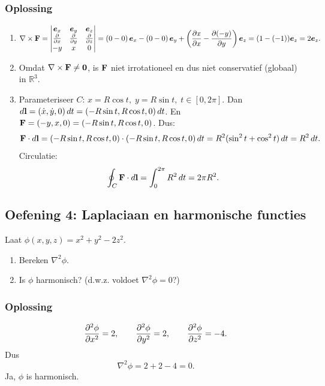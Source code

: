 \documentclass[11pt,a4paper]{article}
\begin{document}
    \subsubsection*{Oplossing}
    \begin{enumerate}
        \item
        \[
            \nabla\times\vb{F}=
            \begin{vmatrix}
                \vb*{e}_x & \vb*{e}_y & \vb*{e}_z\\
                \pdv{}{x} & \pdv{}{y} & \pdv{}{z}\\
                -y & x & 0
            \end{vmatrix}
            =
            \left(0-0\right)\vb*{e}_x
            -\left(0-0\right)\vb*{e}_y
            +\left(\pdv{x}{x}-\pdv{(-y)}{y}\right)\vb*{e}_z
            =
            (1-(-1))\vb*{e}_z = 2\vb*{e}_z.
        \]
        \item Omdat \(\nabla\times\vb{F}\neq \vb{0}\), is \(\vb{F}\) niet irrotationeel en dus niet conservatief (globaal) in \(\mathbb{R}^3\).
        \item Parameteriseer \(C\): \(x=R\cos t,\; y=R\sin t,\; t\in[0,2\pi]\).
        Dan \(d\vb{l}=(\dot x,\dot y,0)\,dt=(-R\sin t, R\cos t,0)\,dt\).
        En \(\vb{F}=(-y,x,0)=(-R\sin t, R\cos t,0)\).
        Dus:
        \[
            \vb{F}\cdot d\vb{l} = (-R\sin t, R\cos t,0)\cdot(-R\sin t, R\cos t,0)\,dt = R^2(\sin^2 t+\cos^2 t)\,dt=R^2\,dt.
        \]
        Circulatie:
        \[
            \oint_C \vb{F}\cdot d\vb{l} = \int_0^{2\pi} R^2\,dt = 2\pi R^2.
        \]
    \end{enumerate}


    \subsection{Oefening 4: Laplaciaan en harmonische functies}
    Laat \(\phi(x,y,z)=x^2+y^2-2z^2\).
    \begin{enumerate}
        \item Bereken \(\nabla^2\phi\).
        \item Is \(\phi\) harmonisch? (d.w.z. voldoet \(\nabla^2\phi=0\)?)
    \end{enumerate}

    \subsubsection*{Oplossing}
    \[
        \pdv[2]{\phi}{x}=2,\qquad \pdv[2]{\phi}{y}=2,\qquad \pdv[2]{\phi}{z}=-4.
    \]
    Dus
    \[
        \nabla^2\phi = 2+2-4=0.
    \]
    Ja, \(\phi\) is harmonisch.
\end{document}
